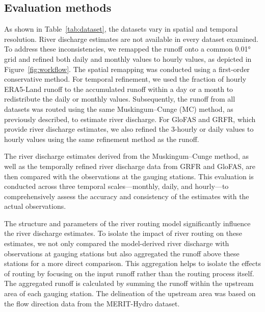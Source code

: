 \documentclass[preprint, review, authoryear, longtitle, 12pt, 3p]{elsarticle}
\begin{document}
\subsection{Evaluation methods}

As shown in Table~\ref{tab:dataset}, the datasets vary in spatial and temporal resolution. River discharge estimates are not available in every dataset examined. To address these inconsistencies, we remapped the runoff onto a common 0.01° grid and refined both daily and monthly values to hourly values, as depicted in Figure~\ref{fig:workflow}. The spatial remapping was conducted using a first-order conservative method. For temporal refinement, we used the fraction of hourly ERA5-Land runoff to the accumulated runoff within a day or a month to redistribute the daily or monthly values. Subsequently, the runoff from all datasets was routed using the same Muskingum--Cunge (MC) method, as previously described, to estimate river discharge. For GloFAS and GRFR, which provide river discharge estimates, we also refined the 3-hourly or daily values to hourly values using the same refinement method as the runoff.

The river discharge estimates derived from the Muskingum--Cunge method, as well as the temporally refined river discharge data from GRFR and GloFAS, are then compared with the observations at the gauging stations. This evaluation is conducted across three temporal scales—monthly, daily, and hourly—to comprehensively assess the accuracy and consistency of the estimates with the actual observations.

The structure and parameters of the river routing model significantly influence the river discharge estimates. To isolate the impact of river routing on these estimates, we not only compared the model-derived river discharge with observations at gauging stations but also aggregated the runoff above these stations for a more direct comparison. This aggregation helps to isolate the effects of routing by focusing on the input runoff rather than the routing process itself. The aggregated runoff is calculated by summing the runoff within the upstream area of each gauging station. The delineation of the upstream area was based on the flow direction data from the MERIT-Hydro dataset.
\end{document}
